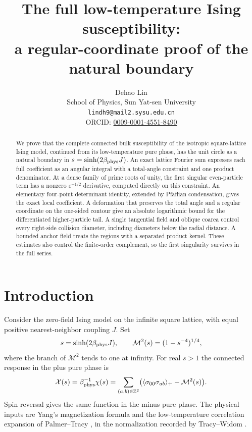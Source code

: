\documentclass[11pt]{article}
\title{The full low-temperature Ising susceptibility:\\ a regular-coordinate proof of the natural boundary}
\author{Dehao Lin\\
\small School of Physics, Sun Yat-sen University\\
\small\texttt{lindh9@mail2.sysu.edu.cn}\\
\small ORCID: \href{https://orcid.org/0009-0001-4551-8490}{0009-0001-4551-8490}}
\date{}
\numberwithin{equation}{section}
\theoremstyle{remark}\newtheorem{remark}[theorem]{Remark}
\newcommand{\X}{\mathcal X}
\newcommand{\Mtwo}{\mathcal M^2}
\begin{document}
\maketitle

\begin{abstract}
We prove that the complete connected bulk susceptibility of the
isotropic square-lattice Ising model, continued from its low-temperature
pure phase, has the unit circle as a natural boundary in
$s=\sinh(2\beta_{\rm phys}J)$. An exact lattice Fourier sum expresses
each full coefficient as an angular integral with a total-angle
constraint and one product denominator. At a dense family of prime
roots of unity, the first singular even-particle term has a nonzero
$\varepsilon^{-1/2}$ derivative, computed directly on this constraint.
An elementary four-point determinant identity, extended by Pfaffian
condensation, gives the exact local coefficient. A deformation that
preserves the total angle and a regular coordinate on the one-sided
contour give an absolute logarithmic bound for the differentiated
higher-particle tail. A single tangential field and oblique coarea
control every right-side collision diameter, including diameters below
the radial distance. A bounded anchor field treats the regions with a
separated product kernel. These estimates also control the finite-order
complement, so the first singularity survives in the full series.
\end{abstract}

\section{Introduction}

Consider the zero-field Ising model on the infinite square lattice,
with equal positive nearest-neighbor coupling $J$. Set
\[
 s=\sinh(2\beta_{\rm phys}J),\qquad
 \Mtwo(s)=(1-s^{-4})^{1/4},
\]
where the branch of $\Mtwo$ tends to one at infinity.
For real $s>1$ the connected response in the plus pure phase is
\begin{equation}\label{eq:physical}
 \X(s)=\beta_{\rm phys}^{-1}\chi(s)
 =\sum_{(a,b)\in\mathbb Z^2}
       \bigl(\langle\sigma_{00}\sigma_{ab}\rangle_+
                     -\Mtwo(s)\bigr).
\end{equation}
Spin reversal gives the same function in the minus pure phase.
The physical inputs are Yang's magnetization formula and the
low-temperature correlation expansion of Palmer--Tracy
\cite{Yang,PalmerTracy}, in the normalization recorded by
Tracy--Widom \cite[Appendix 1, pp.~1132--1133]{TracyWidom}.
\end{document}
